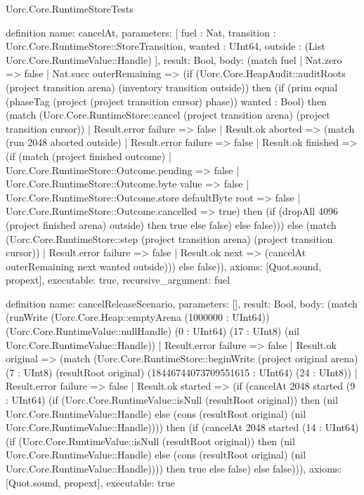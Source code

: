 \begin{lexlean}{Uorc.Core.RuntimeStoreTests}
\begin{semanticmodule}
definition{
  name: cancelAt,
  parameters: [
    fuel : Nat,
    transition : Uorc.Core.RuntimeStore::StoreTransition,
    wanted : UInt64,
    outside : (List Uorc.Core.RuntimeValue::Handle)
  ],
  result: Bool,
  body: (match fuel
    | Nat.zero => false
    | Nat.succ outerRemaining => (if (Uorc.Core.HeapAudit::auditRoots (project transition arena) (inventory transition outside)) then (if (prim equal (phaseTag (project (project transition cursor) phase)) wanted : Bool) then (match (Uorc.Core.RuntimeStore::cancel (project transition arena) (project transition cursor))
      | Result.error failure => false
      | Result.ok aborted => (match (run 2048 aborted outside)
        | Result.error failure => false
        | Result.ok finished => (if (match (project finished outcome)
          | Uorc.Core.RuntimeStore::Outcome.pending => false
          | Uorc.Core.RuntimeStore::Outcome.byte value => false
          | Uorc.Core.RuntimeStore::Outcome.store defaultByte root => false
          | Uorc.Core.RuntimeStore::Outcome.cancelled => true) then (if (dropAll 4096 (project finished arena) outside) then true else false) else false))) else (match (Uorc.Core.RuntimeStore::step (project transition arena) (project transition cursor))
      | Result.error failure => false
      | Result.ok next => (cancelAt outerRemaining next wanted outside))) else false)),
  axioms: [Quot.sound, propext],
  executable: true,
  recursive_argument: fuel
}

definition{
  name: cancelReleaseScenario,
  parameters: [],
  result: Bool,
  body: (match (runWrite (Uorc.Core.Heap::emptyArena (1000000 : UInt64)) (Uorc.Core.RuntimeValue::nullHandle) (0 : UInt64) (17 : UInt8) (nil Uorc.Core.RuntimeValue::Handle))
    | Result.error failure => false
    | Result.ok original => (match (Uorc.Core.RuntimeStore::beginWrite (project original arena) (7 : UInt8) (resultRoot original) (18446744073709551615 : UInt64) (24 : UInt8))
      | Result.error failure => false
      | Result.ok started => (if (cancelAt 2048 started (9 : UInt64) (if (Uorc.Core.RuntimeValue::isNull (resultRoot original)) then (nil Uorc.Core.RuntimeValue::Handle) else (cons (resultRoot original) (nil Uorc.Core.RuntimeValue::Handle)))) then (if (cancelAt 2048 started (14 : UInt64) (if (Uorc.Core.RuntimeValue::isNull (resultRoot original)) then (nil Uorc.Core.RuntimeValue::Handle) else (cons (resultRoot original) (nil Uorc.Core.RuntimeValue::Handle)))) then true else false) else false))),
  axioms: [Quot.sound, propext],
  executable: true
}


\end{semanticmodule}
\end{lexlean}

